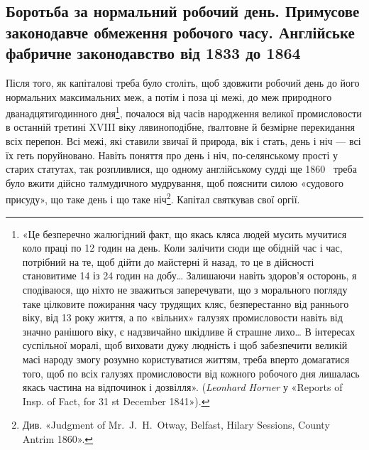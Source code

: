 \subsection{Боротьба за нормальний робочий день. Примусове законодавче
обмеження робочого часу. Англійське фабричне законодавство
від 1833 до 1864~}

Після того, як капіталові треба було століть, щоб здовжити
робочий день до його нормальних максимальних меж, а потім і
поза ці межі, до меж природного дванадцятигодинного дня\footnote{
«Це безперечно жалюгідний факт, що якась кляса людей мусить
мучитися коло праці по 12 годин на день. Коли залічити сюди ще обідній
час і час, потрібний на те, щоб дійти до майстерні й назад, то це в дійсності
становитиме 14 із 24 годин на добу\dots{} Залишаючи навіть здоров’я осторонь,
я сподіваюся, що ніхто не зважиться заперечувати, що з морального
погляду таке цілковите пожирання часу трудящих кляс, безперестанно
від раннього віку, від 13 року життя, а по «вільних» галузях промисловости
навіть від значно ранішого віку, є надзвичайно шкідливе й страшне
лихо\dots{} В інтересах суспільної моралі, щоб виховати дужу людність
і щоб забезпечити великій масі народу змогу розумно користуватися
життям, треба вперто домагатися того, щоб по всіх галузях промисловости
від кожного робочого дня лишалась якась частина на відпочинок і дозвілля».
(\emph{Leonhard Horner} у «Reports of Insp. of Fact, for 31 st December
1841»).
},
почалося від часів народження великої промисловости в останній
третині XVIII віку лявиноподібне, ґвалтовне й безмірне перекидання
всіх перепон. Всі межі, які ставили звичаї й природа,
вік і стать, день і ніч — всі їх геть поруйновано. Навіть поняття
про день і ніч, по-селянському прості у старих статутах, так
розпливлися, що одному англійському судді ще 1860~ треба
було вжити дійсно талмудичного мудрування, щоб пояснити
силою «судового присуду», що таке день і що таке ніч\footnote{
Див. «Judgment of Mr.~J.~H.~Otway, Belfast, Hilary Sessions,
County Antrim 1860».
}. Капітал святкував свої оргії.

